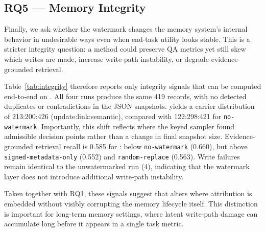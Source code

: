 


\subsection{RQ5 — Memory Integrity}
\label{sec:rq5}
Finally, we ask whether the watermark changes the memory system's
internal behavior in undesirable ways even when end-task utility looks
stable. This is a stricter integrity question: a method could preserve
QA metrics yet still skew which writes are made, increase write-path
instability, or degrade evidence-grounded retrieval.

Table~\ref{tab:integrity} therefore reports only integrity signals that
can be computed end-to-end on \locomo{}. All four \amem{} runs produce
the same 419 records, with no detected duplicates or contradictions in
the JSON snapshots. \memmark{} yields a carrier distribution of
213:200:426 (update:link:semantic), compared with 122:298:421 for
\texttt{no-watermark}. Importantly, this shift reflects where the
keyed sampler found admissible decision points rather than a change in
final snapshot size. Evidence-grounded retrieval recall is 0.585 for
\memmark{}: below \texttt{no-watermark} (0.660), but above
\texttt{signed-metadata-only} (0.552) and
\texttt{random-replace} (0.563). Write failures remain identical to the
unwatermarked run (4), indicating that the watermark layer does not
introduce additional write-path instability.

Taken together with RQ1, these signals suggest that \memmark{} alters
where attribution is embedded without visibly corrupting the memory
lifecycle itself. This distinction is important for long-term memory
settings, where latent write-path damage can accumulate long before it
appears in a single task metric.




